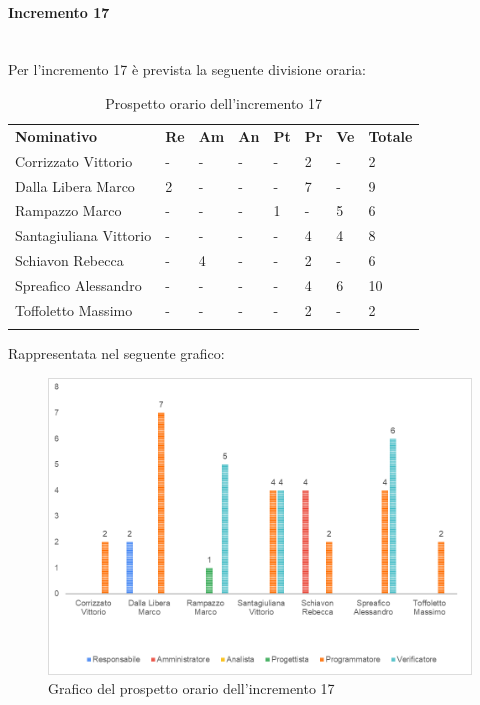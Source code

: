 \paragraph{Incremento 17} \mbox{} \\
Per l'incremento 17 è prevista la seguente divisione oraria:
\begin{longtable} {				
		>{}p{40mm}  
		>{}p{8mm}
		>{}p{8mm}
		>{}p{8mm}
		>{}p{8mm}
		>{}p{8mm}
		>{}p{8mm}
		>{}p{12mm}				
	}			
	\rowcolor{gray!50}
	\textbf{Nominativo} & \textbf{Re} & \textbf{Am} & \textbf{An} & \textbf{Pt} & \textbf{Pr} & \textbf{Ve} & \textbf{Totale}	\TBstrut \\ [2mm]
	Corrizzato Vittorio & - & - & - & - & 2 & - & 2 \TBstrut \\ [2mm]
	Dalla Libera Marco & 2 & - & - & - & 7 & - & 9 \TBstrut \\ [2mm]
	Rampazzo Marco & - & - & - & 1 & - & 5 & 6 \TBstrut \\ [2mm]
	Santagiuliana Vittorio & - & - & - & - & 4 & 4 & 8 \TBstrut \\ [2mm]
	Schiavon Rebecca & - & 4 & - & - & 2 & - & 6 \TBstrut \\ [2mm]
	Spreafico Alessandro & - & - & - & - & 4 & 6 & 10 \TBstrut \\ [2mm]
	Toffoletto Massimo & - & - & - & - & 2 & - & 2 \TBstrut \\ [2mm]
	\rowcolor{white}
	\caption{Prospetto orario dell'incremento 17}
\end{longtable}
Rappresentata nel seguente grafico:
\begin{figure} [H]
	\includegraphics[width=\linewidth]{./img/Grafici/ra2.png}
	\caption{Grafico del prospetto orario dell'incremento 17}
\end{figure}

